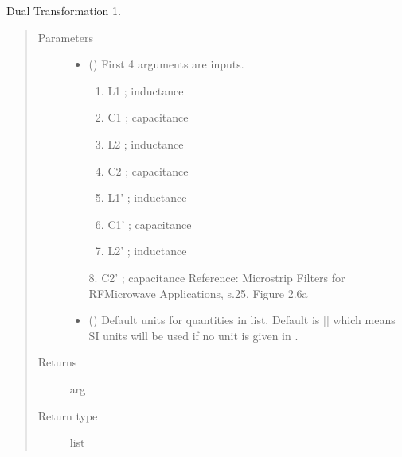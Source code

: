 \documentclass[letterpaper,10pt,english]{sphinxmanual}
\begin{document}

\begin{fulllineitems}
\label{\detokenize{components:components.DualTransformation1}}
Dual Transformation 1.
\begin{quote}\begin{description}
\item[{Parameters}] \leavevmode\begin{itemize}
\item {} 
 () \textendash{} 
First 4 arguments are inputs.
\begin{enumerate}
%
\item {} 
L1 ; inductance

\item {} 
C1 ; capacitance

\item {} 
L2 ; inductance

\item {} 
C2 ; capacitance

\item {} 
L1’ ; inductance

\item {} 
C1’ ; capacitance

\item {} 
L2’ ; inductance

\end{enumerate}

8.  C2’ ; capacitance
Reference:  Microstrip Filters for RF\sphinxhyphen{}Microwave Applications, s.25, Figure 2.6a


\item {} 
 (\sphinxstyleliteralemphasis{\sphinxupquote{, }}) \textendash{} Default units for quantities in  list. Default is {[}{]} which means SI units will be used if no unit is given in .

\end{itemize}

\item[{Returns}] \leavevmode
arg

\item[{Return type}] \leavevmode
list

\end{description}\end{quote}

\end{fulllineitems}
\end{document}
